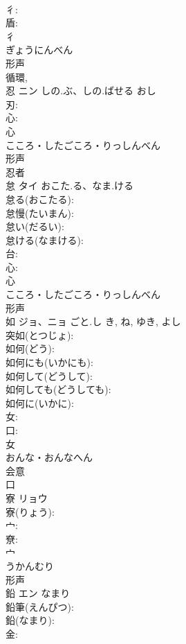 \documentclass[8pt]{extreport}
\begin{document}
\begin{CJK}{UTF8}{min}
\\	彳: 
\\	盾: 
\\	彳	
\\	ぎょうにんべん	
\\	形声 
\\	循環, 
\\	忍	ニン	しの.ぶ、しの.ばせる	おし	
\\	刃: 
\\	心: 
\\	心	
\\	こころ・したごころ・りっしんべん	
\\	形声 
\\	忍者 
\\	怠	タイ	おこた.る、なま.ける		
\\	怠る(おこたる): 
\\	怠慢(たいまん): 
\\	怠い(だるい): 
\\	怠ける(なまける): 
\\	台: 
\\	心: 
\\	心	
\\	こころ・したごころ・りっしんべん	
\\	形声 
\\	如	ジョ、ニョ	ごと.し	き, ね, ゆき, よし	
\\	突如(とつじょ): 
\\	如何(どう): 
\\	如何にも(いかにも): 
\\	如何して(どうして): 
\\	如何しても(どうしても): 
\\	如何に(いかに): 
\\	女: 
\\	口: 
\\	女	
\\	おんな・おんなへん	
\\	会意 
\\	口
\\	寮	リョウ			
\\	寮(りょう): 
\\	宀: 
\\	尞: 
\\	宀	
\\	うかんむり	
\\	形声 
\\	鉛	エン	なまり		
\\	鉛筆(えんぴつ): 
\\	鉛(なまり): 
\\	金: 

\end{CJK}
\end{document}
